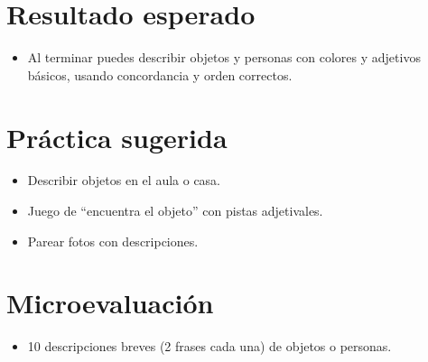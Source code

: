 \section{Resultado esperado}
\begin{itemize}[leftmargin=*]
	\item Al terminar puedes describir objetos y personas con colores y adjetivos básicos, usando concordancia y orden correctos.
\end{itemize}

\section{Práctica sugerida}
\begin{itemize}[leftmargin=*]
	\item Describir objetos en el aula o casa.
	\item Juego de ``encuentra el objeto'' con pistas adjetivales.
	\item Parear fotos con descripciones.
\end{itemize}

\section{Microevaluación}
\begin{itemize}[leftmargin=*]
	\item 10 descripciones breves (2 frases cada una) de objetos o personas.
\end{itemize}
